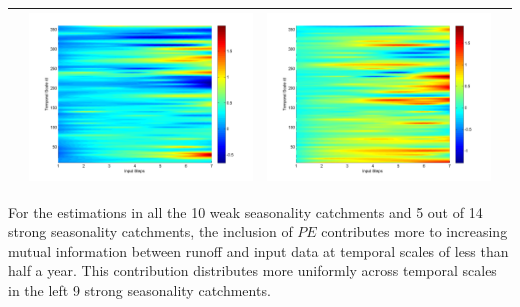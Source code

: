 \documentclass[11pt]{article}
\begin{document}
\begin{table}[H]
{\begin{tabular}{cccc}
&\begin{minipage}{.3\textwidth}\includegraphics[width=\linewidth]{resultgraph/06810000diff_ep.png}\end{minipage}
&\begin{minipage}{.3\textwidth}\includegraphics[width=\linewidth]{resultgraph/06810000diff_q.png}\end{minipage}
\\
\bottomrule
\end{tabular}
}
\end{table}

For the estimations in all the 10 weak seasonality catchments and 5 out of 14 strong seasonality catchments, the inclusion of $PE$  contributes more to increasing mutual information between runoff and input data at temporal scales of less than half a year. This contribution distributes more uniformly across temporal scales in the left 9 strong seasonality catchments. 
\end{document}

